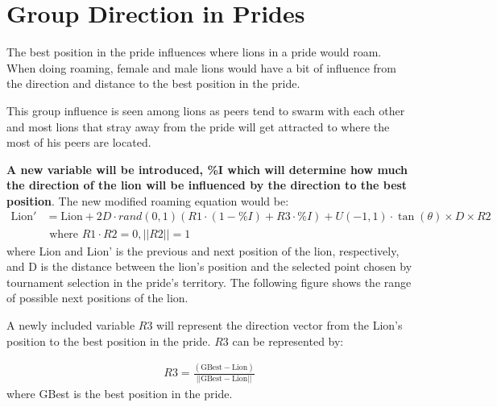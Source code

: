 \section{Group Direction in Prides}
\par The best position in the pride influences where lions in a pride would roam. When doing roaming, female and male lions would have a bit of influence from the direction and distance to the best position in the pride.

\par This group influence is seen among lions as peers tend to swarm with each other and most lions that stray away from the pride will get attracted to where the most of his peers are located.

\par \textbf{A new variable will be introduced, \%I which will determine how much the direction of the lion will be influenced by the direction to the best position}. The new modified roaming equation would be:
\begin{align*}
\text{Lion}' &= \text{Lion} + 2D \cdot rand(0,1) ({R1}\cdot(1-\%I) + R3\cdot\%I) + U(-1,1) \cdot \tan(\theta) \times D \times {R2} \\
&\text{  where } R1 \cdot R2 = 0, ||R2|| = 1
\end{align*}
where Lion and Lion' is the previous and next position of the  lion, respectively, and D is the distance between the  lion's position and the selected point chosen by tournament selection in the pride's territory. The following figure shows the range of possible next positions of the lion.

\par A newly included variable $R3$ will represent the direction vector from the Lion's position to the best position in the pride. $R3$ can be represented by:

\begin{align*}
  R3 = \frac{(\text{GBest} - \text{Lion})}{||\text{GBest} - \text{Lion}||}
\end{align*}
where GBest is the best position in the pride.
